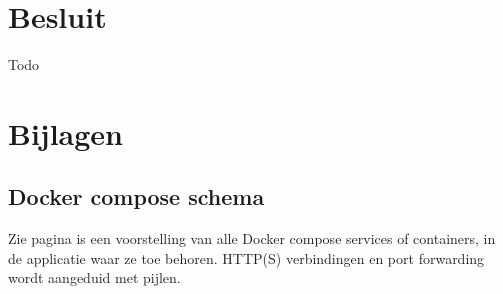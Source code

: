 \documentclass[a4paper,12pt]{report}
\begin{document}


\chapter*{Besluit}
Todo

\chapter*{Bijlagen}

\section{Docker compose schema}
Zie pagina \pageref{bijlage:aangepast-systeem-schema-docker} is een voorstelling van alle Docker compose services of containers, in de applicatie waar ze toe behoren.
HTTP(S) verbindingen en port forwarding wordt aangeduid met pijlen.



\printbibliography
{}

\newpage
\thispagestyle{empty}
\mbox{}

\newpage
\thispagestyle{empty}
\mbox{}
\end{document}
